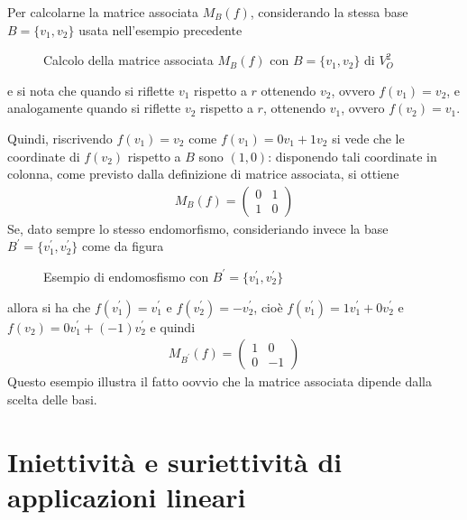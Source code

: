 \begin{es}
\begin{enumerate}
    Per calcolarne la matrice associata $M_B(f)$, considerando la stessa base $B=\{v_1,v_2\}$
    usata nell'esempio precedente
    \clearpage
    \begin{figure}[ht!]
      \centering
      \resizebox{5cm}{!}{}
      \caption{Calcolo della matrice associata $M_B(f)$ con $B=\{v_1,v_2\}$ di $V_O^2$}
      \label{fig:mtxAsaplin8}
    \end{figure}
    e si nota che quando si riflette $v_1$ rispetto a $r$ ottenendo $v_2$, ovvero $f(v_1)=v_2$,
    e analogamente quando si riflette $v_2$ rispetto a $r$, ottenendo $v_1$, ovvero $f(v_2)=v_1$.

    Quindi, riscrivendo $f(v_1)=v_2$ come $f(v_1)=0v_1+1v_2$ si vede che le coordinate di $f(v_2)$
    rispetto a $B$ sono $(1,0)$: disponendo tali coordinate in colonna, come previsto dalla
    definizione di matrice associata, si ottiene
    \begin{eqnarray*}
      M_B(f)=
      \begin{pmatrix}
        0 & 1 \\
        1 & 0
      \end{pmatrix}
    \end{eqnarray*}
    Se, dato sempre lo stesso endomorfismo, consideriando invece la base $B^\prime=\{v_1^\prime,
    v_2^\prime\}$ come da figura
    \begin{figure}[ht!]
      \centering
      \resizebox{5cm}{!}{}
      \caption{Esempio di endomosfismo con $B^\prime=\{v_1^\prime,v_2^\prime\}$}
      \label{fig:mtxAsaplin9}
    \end{figure}

    allora si ha che $f(v_1^\prime)=v_1^\prime$ e $f(v_2^\prime)=-v_2^\prime$, cioè $f(v_1^\prime)
    =1v_1^\prime+0v_2^\prime$ e $f(v_2)=0v_1^\prime+(-1)v_2^\prime$ e quindi
    \begin{eqnarray*}
      M_{B^\prime}(f)=
      \begin{pmatrix}
        1 & 0 \\
        0 & -1
      \end{pmatrix}
    \end{eqnarray*}
    Questo esempio illustra il fatto oovvio che la matrice associata dipende dalla scelta delle
    basi.
  \end{enumerate}
\end{es}

\section{Iniettività e suriettività di applicazioni lineari}
\label{sec:inietesuriet}

